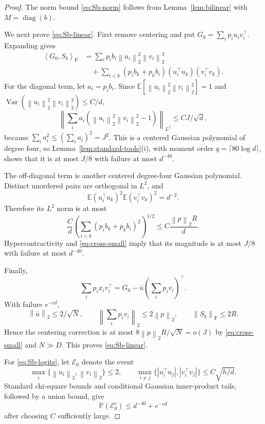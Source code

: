 \documentclass[11pt]{article}
\theoremstyle{remark}
\newcommand{\E}{\mathbb E}
\newcommand{\Pp}{\mathbb P}
\newcommand{\ip}[2]{\left\langle #1,#2\right\rangle}
\newcommand{\norm}[1]{\left\lVert #1\right\rVert}
\newcommand{\F}{\mathrm{F}}
\newcommand{\1}{\mathbf 1}
\newcommand{\diag}{\operatorname{diag}}
\begin{document}
\begin{proof}
The norm bound \eqref{eq:Sb-norm} follows from
Lemma~\ref{lem:bilinear} with $M=\diag(b)$.

We next prove \eqref{eq:Sb-linear}.  First remove centering and put
$G_0=\sum_i p_i u_iv_i^\top$.  Expanding gives
\begin{align*}
 \ip{G_0}{S_b}_{\F}
 &=\sum_i p_ib_i\norm{u_i}_2^2\norm{v_i}_2^2\\
 &\quad+\sum_{i<k}(p_ib_k+p_kb_i)
 (u_i^\top u_k)(v_i^\top v_k).
\end{align*}
For the diagonal term, let $a_i=p_ib_i$.  Since
$\E[\norm{u_i}_2^2\norm{v_i}_2^2]=1$ and
$\operatorname{Var}(\norm{u_i}_2^2\norm{v_i}_2^2)\leq C/d$,
\[
 \left\|\sum_i a_i
 (\norm{u_i}_2^2\norm{v_i}_2^2-1)\right\|_{L^2}
 \leq C J/\sqrt d,
\]
because $\sum_i a_i^2\leq(\sum_i a_i)^2=J^2$.  This is a centered
Gaussian polynomial of degree four, so Lemma~\ref{lem:standard-tools}(i),
with moment order $q=\lceil80\log d\rceil$, shows that it is at most
$J/8$ with failure at most $d^{-40}$.

The off-diagonal term is another centered degree-four Gaussian
polynomial.  Distinct unordered pairs are orthogonal in $L^2$, and
\[
 \E(u_i^\top u_k)^2\E(v_i^\top v_k)^2=d^{-2}.
\]
Therefore its $L^2$ norm is at most
\[
 \frac C d
 \left(\sum_{i<k}(p_ib_k+p_kb_i)^2\right)^{1/2}
 \leq C\frac{\norm p_2R}{d}.
\]
Hypercontractivity and \eqref{eq:cross-small} imply that its magnitude
is at most $J/8$ with failure at most $d^{-40}$.

Finally,
\[
 \sum_i p_ix_iv_i^\top
 =G_0-\bar u\left(\sum_i p_iv_i\right)^\top.
\]
With failure $e^{-cd}$,
\[
 \norm{\bar u}_2\leq2/\sqrt N,
 \qquad
 \norm{\sum_i p_iv_i}_2\leq2\norm p_2,
 \qquad
 \norm{S_b}_{\F}\leq2R.
\]
Hence the centering correction is at most
$8\norm p_2R/\sqrt N=o(J)$ by \eqref{eq:cross-small} and
$N\gg D$.  This proves \eqref{eq:Sb-linear}.

For \eqref{eq:Sb-logits}, let $\mathcal E_0$ denote the event
\begin{equation}
 \max_i\{\norm{u_i}_2,\norm{v_i}_2\}\leq2,
 \qquad
 \max_{i\neq j}\{|u_i^\top u_j|,|v_i^\top v_j|\}
 \leq C\sqrt{h/d}.
 \label{eq:uniform-norm-inner}
\end{equation}
Standard chi-square bounds and conditional Gaussian inner-product
tails, followed by a union bound, give
\[
 \Pp(\mathcal E_0^c)\leq d^{-40}+e^{-cd}
\]
after choosing $C$ sufficiently large.


\end{proof}
\end{document}
